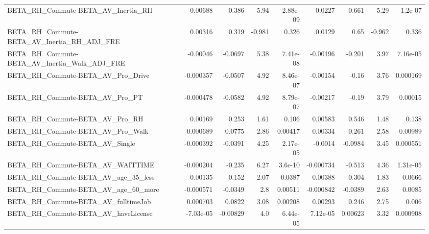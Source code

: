 \begin{tabular}{lrrrrrrrr}
BETA\_RH\_Commute-BETA\_AV\_Inertia\_RH                 &     0.00688 &        0.386 &    -5.94 & 2.88e-09 &     0.0227 &       0.661 &        -5.29 &       1.2e-07 \\
BETA\_RH\_Commute-BETA\_AV\_Inertia\_RH\_ADJ\_FRE         &     0.00316 &        0.319 &   -0.981 &    0.326 &     0.0129 &        0.65 &       -0.962 &         0.336 \\
BETA\_RH\_Commute-BETA\_AV\_Inertia\_Walk\_ADJ\_FRE       &    -0.00046 &      -0.0697 &     5.38 & 7.41e-08 &   -0.00196 &      -0.201 &         3.97 &      7.16e-05 \\
BETA\_RH\_Commute-BETA\_AV\_Pro\_Drive                  &   -0.000357 &      -0.0507 &     4.92 & 8.46e-07 &   -0.00154 &       -0.16 &         3.76 &      0.000169 \\
BETA\_RH\_Commute-BETA\_AV\_Pro\_PT                     &   -0.000478 &      -0.0582 &     4.92 & 8.79e-07 &   -0.00217 &       -0.19 &         3.79 &       0.00015 \\
BETA\_RH\_Commute-BETA\_AV\_Pro\_RH                     &     0.00169 &        0.253 &     1.61 &    0.106 &    0.00583 &       0.546 &         1.48 &         0.138 \\
BETA\_RH\_Commute-BETA\_AV\_Pro\_Walk                   &    0.000689 &       0.0775 &     2.86 &  0.00417 &    0.00334 &       0.261 &         2.58 &       0.00989 \\
BETA\_RH\_Commute-BETA\_AV\_Single                     &   -0.000392 &      -0.0391 &     4.25 & 2.17e-05 &    -0.0014 &     -0.0984 &         3.45 &      0.000551 \\
BETA\_RH\_Commute-BETA\_AV\_WAITTIME                   &   -0.000204 &       -0.235 &     6.27 &  3.6e-10 &  -0.000734 &      -0.513 &         4.36 &      1.31e-05 \\
BETA\_RH\_Commute-BETA\_AV\_age\_35\_less                &     0.00135 &        0.152 &     2.07 &   0.0387 &    0.00388 &       0.304 &         1.83 &        0.0666 \\
BETA\_RH\_Commute-BETA\_AV\_age\_60\_more                &   -0.000571 &      -0.0349 &      2.8 &  0.00511 &  -0.000842 &     -0.0389 &         2.63 &        0.0085 \\
BETA\_RH\_Commute-BETA\_AV\_fulltimeJob                &    0.000703 &       0.0822 &     3.08 &  0.00208 &    0.00293 &       0.246 &         2.75 &         0.006 \\
BETA\_RH\_Commute-BETA\_AV\_haveLicense                &   -7.03e-05 &     -0.00829 &      4.0 & 6.44e-05 &   7.12e-05 &     0.00623 &         3.32 &      0.000908 \\

\end{tabular}

